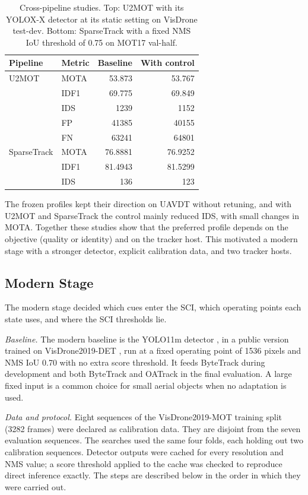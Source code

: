 \begin{table}[tbp]
\centering
\caption{Cross-pipeline studies. Top: U2MOT with its YOLOX-X detector at its static setting on VisDrone test-dev. Bottom: SparseTrack with a fixed NMS IoU threshold of 0.75 on MOT17 val-half.}
\label{tab:ac-u2mot}
\begin{tabular}{llrr}
\toprule
Pipeline & Metric & Baseline & With control\\
\midrule
U2MOT & MOTA & 53.873 & 53.767\\
 & IDF1 & 69.775 & 69.849\\
 & IDS & 1239 & 1152\\
 & FP & 41385 & 40155\\
 & FN & 63241 & 64801\\
\midrule
SparseTrack & MOTA & 76.8881 & 76.9252\\
 & IDF1 & 81.4943 & 81.5299\\
 & IDS & 136 & 123\\
\bottomrule
\end{tabular}
\end{table}

The frozen profiles kept their direction on UAVDT without retuning, and with U2MOT and SparseTrack the control mainly reduced IDS, with small changes in MOTA. Together these studies show that the preferred profile depends on the objective (quality or identity) and on the tracker host. This motivated a modern stage with a stronger detector, explicit calibration data, and two tracker hosts.

\subsection{Modern Stage}\label{sec:ac-modern}
The modern stage decided which cues enter the SCI, which operating points each state uses, and where the SCI thresholds lie.

\emph{Baseline.} The modern baseline is the YOLO11m detector \cite{jocher2024yolo11}, in a public version trained on VisDrone2019-DET \cite{zhu2022visdrone}, run at a fixed operating point of 1536 pixels and NMS IoU 0.70 with no extra score threshold. It feeds ByteTrack \cite{zhang2022bytetrack} during development and both ByteTrack and OATrack \cite{qi2026oatrack} in the final evaluation. A large fixed input is a common choice for small aerial objects when no adaptation is used.

\emph{Data and protocol.} Eight sequences of the VisDrone2019-MOT training split (3282 frames) were declared as calibration data. They are disjoint from the seven evaluation sequences. The searches used the same four folds, each holding out two calibration sequences. Detector outputs were cached for every resolution and NMS value; a score threshold applied to the cache was checked to reproduce direct inference exactly. The steps are described below in the order in which they were carried out.


